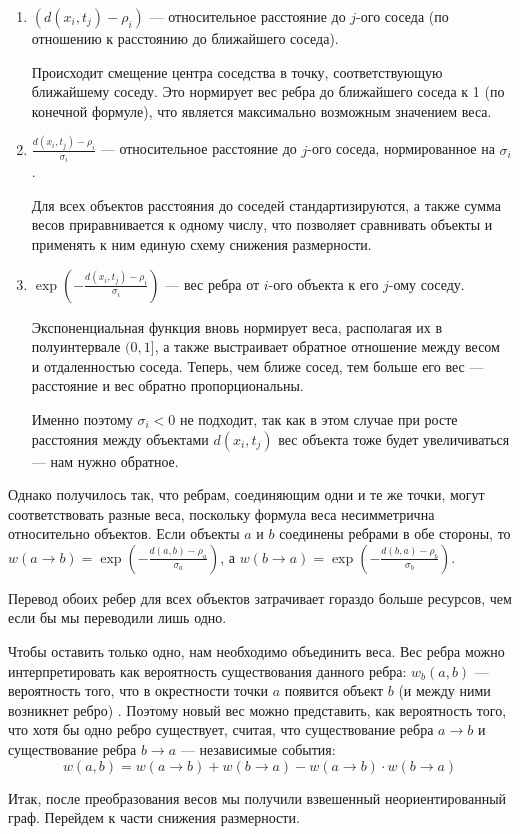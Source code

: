 \begin{enumerate}
	\item $(\displaystyle d(x_i, t_j) - \rho_i)$ --- относительное расстояние до $j$-ого соседа (по отношению к расстоянию до ближайшего соседа).
	
	Происходит смещение центра соседства в точку, соответствующую ближайшему соседу. Это нормирует вес ребра до ближайшего соседа к 1 (по конечной формуле), что является максимально возможным значением веса.
	
	\item $\displaystyle\frac{d(x_i, t_j) - \rho_i}{\sigma_i}$ --- относительное расстояние до $j$-ого соседа, нормированное на $\sigma_i$.
	
	Для всех объектов расстояния до соседей стандартизируются, а также сумма весов приравнивается к одному числу, что позволяет сравнивать объекты и применять к ним единую схему снижения размерности.
	\item $\displaystyle \exp\left(-\frac{d(x_i, t_j) - \rho_i}{\sigma_i}\right)$ --- вес ребра от $i$-ого объекта к его $j$-ому соседу.
	
	Экспоненциальная функция вновь нормирует веса, располагая их в полуинтервале $(0, 1]$, а также выстраивает обратное отношение между весом и отдаленностью соседа. Теперь, чем ближе сосед, тем больше его вес --- расстояние и вес обратно пропорциональны.
	
	Именно поэтому $\sigma_i < 0$ не подходит, так как в этом случае при росте расстояния между объектами $d(x_i, t_j)$ вес объекта тоже будет увеличиваться --- нам нужно обратное.
\end{enumerate}

Однако получилось так, что ребрам, соединяющим одни и те же точки, могут соответствовать разные веса, поскольку формула веса несимметрична относительно объектов. Если объекты $a$ и $b$ соединены ребрами в обе стороны, то $\displaystyle w(a \rightarrow b) = \exp\left(-\frac{d(a, b) - \rho_a}{\sigma_a}\right)$, а $\displaystyle w(b \rightarrow a) = \exp\left(-\frac{d(b, a) - \rho_b}{\sigma_b}\right)$.

Перевод обоих ребер для всех объектов затрачивает гораздо больше ресурсов, чем если бы мы переводили лишь одно.

Чтобы оставить только одно, нам необходимо объединить веса. Вес ребра можно интерпретировать как вероятность существования данного ребра: $w_b(a, b)$ --- вероятность того, что в окрестности точки $a$ появится объект $b$ (и между ними возникнет ребро) \cite{hansen}. Поэтому новый вес можно представить, как вероятность того, что хотя бы одно ребро существует, считая, что существование ребра $a \rightarrow b$ и существование ребра $b \rightarrow a$ --- независимые события:
\begin{equation}
	w(a,b) = w(a \rightarrow b) + w(b \rightarrow a) - w(a \rightarrow b) \cdot w(b \rightarrow a)
\end{equation}

Итак, после преобразования весов мы получили взвешенный неориентированный граф. Перейдем к части снижения размерности.